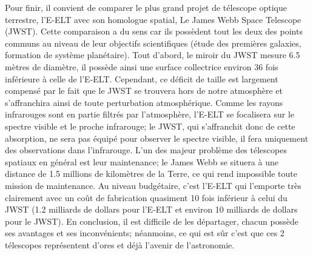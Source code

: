Pour finir, il convient de comparer le plus grand projet de télescope optique terrestre, l'E-ELT avec son homologue spatial, Le James Webb Space Telescope (JWST). Cette comparaison a du sens car ils possèdent tout les deux des points communs au niveau de leur objectifs scientifiques (étude des premières galaxies, formation de système planétaire). Tout d'abord, le miroir du JWST mesure 6.5 mètres de diamètre, il possède ainsi une surface collectrice environ 36 fois inférieure à celle de l'E-ELT. Cependant, ce déficit de taille est largement compensé par le fait que le JWST se trouvera hors de notre atmosphère et s'affranchira ainsi de toute perturbation atmosphérique. Comme les rayons infrarouges sont en partie filtrés par l'atmosphère, l'E-ELT se focalisera sur le spectre visible et le proche infrarouge; le JWST, qui s'affranchit donc de cette absorption, ne sera pas équipé pour observer le spectre visible, il fera uniquement des observations dans l'infrarouge. L'un des majeur problème des télescopes spatiaux en général est leur maintenance; le James Webb se situera à une distance de 1.5 millions de kilomètres de la Terre, ce qui rend impossible toute mission de maintenance. Au niveau budgétaire, c'est l'E-ELT qui l'emporte très clairement avec un coût de fabrication quasiment 10 fois inférieur à celui du JWST (1.2 milliards de dollars pour l'E-ELT et environ 10 milliards de dollars pour le JWST). En conclusion, il est difficile de les départager, chacun possède ses avantages et ses inconvénients; néanmoins, ce qui est sûr c'est que ces 2 télescopes représentent d'ores et déjà l'avenir de l'astronomie. 